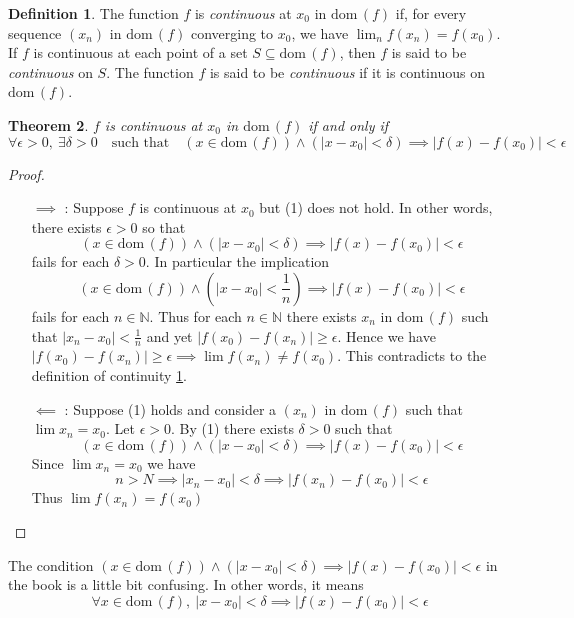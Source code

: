 \documentclass[12pt, lettersize]{book}
\theoremstyle{plain}
\newtheorem{thm}{Theorem}[section]
\theoremstyle{definition}
\newtheorem{dfn}[thm]{Definition}
\theoremstyle{remark}
\newcommand{\N}{\mathbb{N}}
\newcommand{\dom}{\text{dom}\,}
\begin{document}
			\begin{dfn}\label{def:continuous}
			The function $f$ is \emph{continuous} at $x_0$ in $\dom(f)$ if, for every sequence $(x_n)$ in $\dom(f)$ converging to $x_0$, we have $\lim_nf(x_n)=f(x_0)$. If $f$ is continuous at each point of a set $S\subseteq\dom(f)$, then $f$ is said to be \emph{continuous} on $S$. The function $f$ is said to be
			\emph{continuous} if it is continuous on $\dom(f)$.
			\end{dfn}
		
			\setcounter{equation}{0}
			\begin{thm}\label{def:delta-epsilon property}
				$f$ is continuous at $x_0$ in $\dom(f)$ if and only if
				\begin{equation}
					\forall\epsilon>0,\ \exists\delta>0\quad\text{such that}\quad(x\in\dom(f))\land(|x-x_0|<\delta)\implies|f(x)-f(x_0)|<\epsilon
				\end{equation}
			\end{thm}
			\begin{proof}
			\begin{itemize}
				\item[]
				\item[$\implies$]: Suppose $f$ is continuous at $x_0$ but (1) does not hold. In other words, there exists
				$\epsilon>0$ so that
				\begin{displaymath}
					(x\in\dom(f))\land(|x-x_0|<\delta)\implies|f(x)-f(x_0)|<\epsilon
				\end{displaymath}
				fails for each $\delta>0$. In particular the implication
				\begin{displaymath}
					(x\in\dom(f))\land(|x-x_0|<\frac{1}{n})\implies|f(x)-f(x_0)|<\epsilon
				\end{displaymath}
				fails for each $n\in\N$. Thus for each $n\in\N$ there exists $x_n$ in $\dom(f)$ such that $|x_n-x_0|<\frac{1}{n}$ and yet $|f(x_0)-f(x_n)|\geq\epsilon$. Hence we have $|f(x_0)-f(x_n)|\geq\epsilon\implies\lim f(x_n)\neq f(x_0)$. This contradicts to the definition of continuity \ref{def:continuous}.								
				\item[$\impliedby$]: Suppose (1) holds and consider a $(x_n)$ in $\dom(f)$ such that $\lim x_n=x_0$. Let
				$\epsilon>0$. By (1) there exists $\delta>0$ such that
				\begin{displaymath}
					(x\in\dom(f))\land(|x-x_0|<\delta)\implies|f(x)-f(x_0)|<\epsilon
				\end{displaymath}
				Since $\lim x_n=x_0$ we have
				\begin{displaymath}
					n>N\implies|x_n-x_0|<\delta\implies|f(x_n)-f(x_0)|<\epsilon
				\end{displaymath}
				Thus $\lim f(x_n)=f(x_0)$
			\end{itemize}
			\end{proof}
			The condition $(x\in\dom(f))\land(|x-x_0|<\delta)\implies|f(x)-f(x_0)|<\epsilon$ in the book is a little bit
			confusing. In other words, it means
			\begin{displaymath}
				\forall x\in\dom(f),\ |x-x_0|<\delta\implies|f(x)-f(x_0)|<\epsilon
			\end{displaymath}
			
\end{document}
